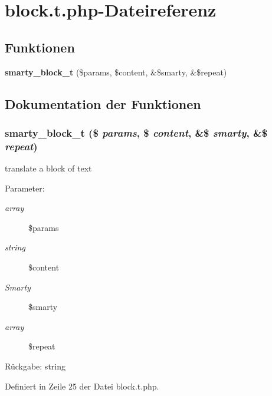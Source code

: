 \section{block.t.php-Dateireferenz}
\label{block_8t_8php}
\subsection*{Funktionen}
\begin{CompactItemize}
\item 
{\bf smarty\_\-block\_\-t} (\$params, \$content, \&\$smarty, \&\$repeat)
\end{CompactItemize}


\subsection{Dokumentation der Funktionen}
\subsubsection{\setlength{\rightskip}{0pt plus 5cm}smarty\_\-block\_\-t (\$ {\em params}, \$ {\em content}, \&\$ {\em smarty}, \&\$ {\em repeat})}\label{block_8t_8php_8d3b2765a25f4a9dcee98d2a85bcf623}


translate a block of text

\begin{Desc}
\item[Parameter:]
\begin{description}
\item[{\em array}]\$params \item[{\em string}]\$content \item[{\em Smarty}]\$smarty \item[{\em array}]\$repeat \end{description}
\end{Desc}
\begin{Desc}
\item[Rückgabe:]string \end{Desc}


Definiert in Zeile 25 der Datei block.t.php.